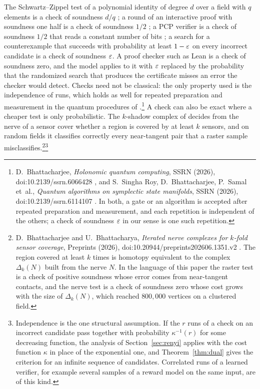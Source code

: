 The Schwartz--Zippel test of a polynomial identity of degree $d$ over a field with $q$ elements is a check of soundness $d/q$ \cite{Sch80,Zip79}; a round of an interactive proof with soundness one half is a check of soundness $1/2$ \cite{Bab85,GMR89}; a PCP verifier is a check of soundness $1/2$ that reads a constant number of bits \cite{AS98,ALM98}; a search for a counterexample that succeeds with probability at least $1-\varepsilon$ on every incorrect candidate is a check of soundness $\varepsilon$. A proof checker such as Lean \cite{MU21} is a check of soundness zero, and the model applies to it with $\varepsilon$ replaced by the probability that the randomized search that produces the certificate misses an error the checker would detect. Checks need not be classical: the only property used is the independence of runs, which holds as well for repeated preparation and measurement in the quantum procedures of \cite{Bha26b,SBS26}.\footnote{D.~Bhattacharjee, \emph{Holonomic quantum computing}, SSRN (2026), doi:10.2139/ssrn.6066428 \cite{Bha26b}, and S.~Singha Roy, D.~Bhattacharjee, P.~Samal et~al., \emph{Quantum algorithms on symplectic state manifolds}, SSRN (2026), doi:10.2139/ssrn.6114107 \cite{SBS26}. In both, a gate or an algorithm is accepted after repeated preparation and measurement, and each repetition is independent of the others; a check of soundness $\varepsilon$ in our sense is one such repetition.} A check can also be exact where a cheaper test is only probabilistic. The $k$-shadow complex of \cite{BB26b} decides from the nerve of a sensor cover whether a region is covered by at least $k$ sensors, and on random fields it classifies correctly every near-tangent pair that a raster sample misclassifies.\footnote{D.~Bhattacharjee and U.~Bhattacharya, \emph{Iterated nerve complexes for $k$-fold sensor coverage}, Preprints (2026), doi:10.20944/preprints202606.1351.v2 \cite{BB26b}. The region covered at least $k$ times is homotopy equivalent to the complex $\Delta_{k}(N)$ built from the nerve $N$. In the language of this paper the raster test is a check of positive soundness whose error comes from near-tangent contacts, and the nerve test is a check of soundness zero whose cost grows with the size of $\Delta_{k}(N)$, which reached $800{,}000$ vertices on a clustered field.}\footnote{Independence is the one structural assumption. If the $r$ runs of a check on an incorrect candidate pass together with probability $\kappa^{-1}(r)$ for some decreasing function, the analysis of Section~\ref{sec:renyi} applies with the cost function $\kappa$ in place of the exponential one, and Theorem~\ref{thm:dual} gives the criterion for an infinite sequence of candidates. Correlated runs of a learned verifier, for example several samples of a reward model on the same input, are of this kind.}

